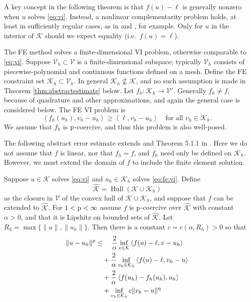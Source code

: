 \documentclass[hidelinks,onefignum,onetabnum,final]{siamart220329}  %
\newcommand{\cK}{\mathcal{K}}
\newcommand{\cV}{\mathcal{V}}
\newcommand{\hcK}{\widehat{\cK}}
\newcommand{\pp}{{\text{\textnormal{p}}}}
\newcommand{\qq}{{\text{\textnormal{q}}}}
\newcommand{\ip}[2]{\left<#1,#2\right>}
\DeclareMathOperator*{\Hull}{Hull}
\begin{document}
A key concept in the following theorem is that $f(u)-\ell$ is generally nonzero when $u$ solves \eqref{eq:vi}.  Instead, a nonlinear complementarity problem holds, at least in sufficiently regular cases, as in \cite[Exercise 5.1.1]{Ciarlet2002}  and \cite[section 7]{BuelerFarrell2024}, for example.  Only for $u$ in the interior of $\cK$ should we expect equality (i.e.~$f(u)=\ell$).

The FE method solves a finite-dimensional VI problem, otherwise comparable to \eqref{eq:vi}.  Suppose $\cV_h \subset \cV$ is a finite-dimensional subspace; typically $\cV_h$ consists of piecewise-polynomial and continuous functions defined on a mesh.  Define the FE constraint set $\cK_h\subset \cV_h$.  In general $\cK_h \nsubseteq \cK$, and no such assumption is made in Theorem \ref{thm:abstractestimate} below.  Let $f_h:\cK_h\to\cV'$.  Generally $f_h\ne f$, because of quadrature and other approximations, and again the general case is considered below.  The FE VI problem is
\begin{equation}
\ip{f_h(u_h)}{v_h-u_h} \ge \ip{\ell}{v_h-u_h} \quad \text{for all } v_h\in \cK_h. \label{eq:fe:vi}
\end{equation}
We assume that $f_h$ is $\pp$-coercive, and thus this problem is also well-posed.

The following abstract error estimate extends \cite{Falk1974} and Theorem 5.1.1 in \cite{Ciarlet2002}.  Here we do not assume that $f$ is linear, nor that $f_h=f$, and $f_h$ need only be defined on $\cK_h$.  However, we must extend the domain of $f$ to include the finite element solution.

\begin{theorem} \label{thm:abstractestimate}  Suppose $u\in\cK$ solves \eqref{eq:vi} and $u_h\in\cK_h$ solves \eqref{eq:fe:vi}.  Define
\begin{equation}
\hcK = \overline{\Hull{(\cK \cup \cK_h)}}  \label{eq:convexhull}
\end{equation}
as the closure in $\cV$ of the convex hull of $\cK \cup \cK_h$, and suppose that $f$ can be extended to $\hcK$.  For $1<\pp<\infty$ assume $f$ is $\pp$-coercive over $\hcK$ with constant $\alpha>0$, and that it is Lipshitz on bounded sets of $\hcK$.  Let $R_h=\max\{\|u\|,\|u_h\|\}$.  Then there is a constant $c=c(\alpha,R_h)>0$ so that
\begin{align}
\|u-u_h\|^p &\le \quad \frac{2}{\alpha} \inf_{v\in\cK} \ip{f(u)-\ell}{v-u_h} \label{eq:abstractestimate} \\
   &\quad + \frac{2}{\alpha} \inf_{v_h\in\cK_h} \ip{f(u)-\ell}{v_h-u} \notag \\
   &\quad + \frac{2}{\alpha} \ip{f(u_h)-f_h(u_h)}{u_h} \notag \\
   &\quad + \inf_{v_h\in\cK_h} c \|v_h - u\|^\qq \notag
\end{align}
\end{theorem}
\end{document}
